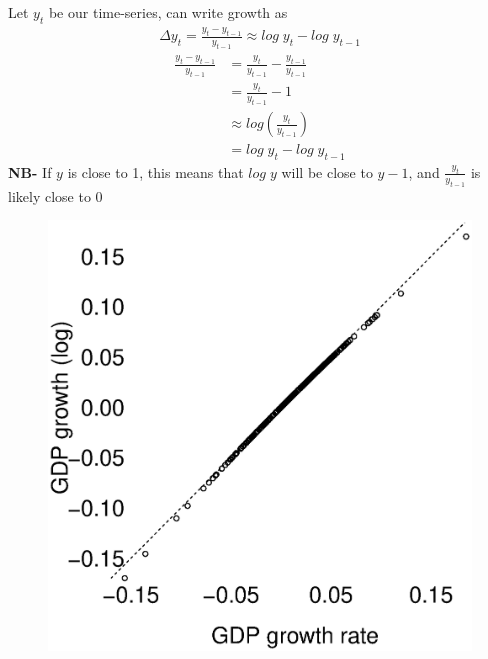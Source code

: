 \documentclass{beamer}
\begin{document}
\begin{frame}
 Let $y_t$ be our time-series, can write growth as  
  \begin{align}
    \Delta y_t = \frac{y_t - y_{t-1}}{y_{t-1}}   \approx  log\; y_t - log\; y_{t-1}
  \end{align}
  \medskip
    \begin{align}
    \frac{y_t - y_{t-1}}{y_{t-1}} &= \frac{y_t}{y_{t-1}}-\frac{y_{t-1}}{y_{t-1}}\\ \nonumber
    &= \frac{y_t}{y_{t-1}}-1 \\ \nonumber
    & \approx log\left(\frac{y_t}{y_{t-1}}\right) \\ \nonumber
    &= log\; y_t-log\; y_{t-1}      
  \end{align}    
  \medskip
  \textbf{NB-} If $y$ is close to 1, this means that $log\;y$ will be close to $y-1$, and $\frac{y_t}{y_{t-1}}$ is likely close to 0  
\end{frame}

\begin{frame}
  \begin{figure}
    \includegraphics[scale=.4]{log_growth.eps}
  \end{figure}
\end{frame}
\end{document}
